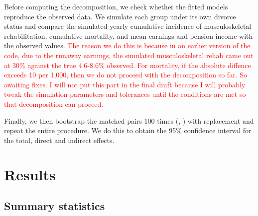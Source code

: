 \documentclass[a4paper,12pt]{article}
\theoremstyle{plain}
\theoremstyle{definition}
\theoremstyle{TheoremNum}
\theoremstyle{CorollaryNum}
\theoremstyle{PropositionNum}
\theoremstyle{TheoremNum}
\begin{document}
Before computing the decomposition, we check whether the fitted models reproduce the observed data. We simulate each group under its own divorce status and compare the simulated yearly cumulative incidence of musculoskeletal rehabilitation, cumulative mortality, and mean earnings and pension income with the observed values. \textcolor{red}{The reason we do this is because in an earlier version of the code, due to the runaway earnings, the simulated musculoskeletal rehab came out at 30\% against the true 4.6-8.6\% observed. For mortality, if the absolute diffence exceeds 10 per 1,000, then we do not proceed with the decomposition so far. So awaiting fixes. I will not put this part in the final draft because I will probably tweak the simulation parameters and tolerances until the conditions are met so that decomposition can proceed.} 

Finally, we then bootstrap the matched pairs 100 times (\citeauthor{efron1993bootstrap}, \citeyear{efron1993bootstrap}) with replacement and repeat the entire procedure. We do this to obtain the 95\% confidence interval for the total, direct and indirect effects.




\section{Results}
\subsection{Summary statistics}


\end{document}
